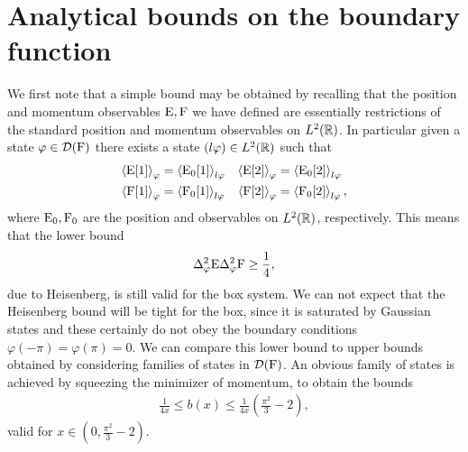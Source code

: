 \section{Analytical bounds on the boundary function}
\label{sec:box-ur-analytical-bounds}
We first note that a simple bound may be obtained by recalling that the position and momentum observables $\operatorname{E},\operatorname{F}$ we have defined are essentially restrictions of the standard position and momentum observables on $L^2(\mathbb{R})$. In particular given a state $\varphi\in\mathcal{D}(\operatorname{F})$ there exists a state $(l\varphi)\in L^2(\mathbb{R})$ such that
\begin{align}
  \left\langle{\operatorname{E}[1]}\right\rangle_{\varphi} &= \left\langle{\operatorname{E}_0[1]}\right\rangle_{l\varphi} & \left\langle{\operatorname{E}[2]}\right\rangle_{\varphi} &= \left\langle{\operatorname{E}_0[2]}\right\rangle_{l\varphi}\\
  \left\langle{\operatorname{F}[1]}\right\rangle_{\varphi} &= \left\langle{\operatorname{F}_0[1]}\right\rangle_{l\varphi} & \left\langle{\operatorname{F}[2]}\right\rangle_{\varphi} &= \left\langle{\operatorname{F}_0[2]}\right\rangle_{l\varphi},
\end{align}
where $\operatorname{E}_0, \operatorname{F}_0$ are the position and observables on $L^2(\mathbb{R})$, respectively. This means that the lower bound
\begin{align}\label{eqn:box-ur-hesenberg-is-a-lower-bound}
  \var[\varphi]{\ope}\var[\varphi]{\opf} \geq \frac{1}{4},
\end{align}
due to Heisenberg, is still valid for the box system. We can not expect that the Heisenberg bound will be tight for the box, since it is saturated by Gaussian states and these certainly do not obey the boundary conditions $\varphi(-\pi) = \varphi(\pi) = 0$. We can compare this lower bound to upper bounds obtained by considering families of states in $\mathcal{D}(\operatorname{F})$. An obvious family of states is achieved by squeezing the minimizer of momentum, to obtain the bounds
\begin{align}
  \frac{1}{4x}\leq b(x) \leq \frac{1}{4x}\left(\frac{\pi^2}{3}-2\right),
\end{align}
valid for $x\in\left(0, \frac{\pi^2}{3}-2\right)$. 

